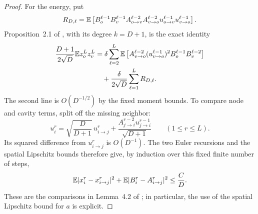 \begin{proof}
For the energy, put
\[
 R_{D,\ell}=\mathbb E\left[
 B_o^{\ell-1}B_v^{\ell-1}
 A_{o\to v}^{\ell-2}A_{v\to o}^{\ell-2}
 u_{o\to v}^{\ell-1}u_{v\to o}^{\ell-1}\right].
\]
Proposition~2.1 of \cite{EAMS2023}, with its degree $k=D+1$, is
the exact identity
\begin{equation}
 \begin{aligned}
 \frac{D+1}{2\sqrt D}\mathbb E z_o^Lz_v^L
 &=\delta\sum_{\ell=2}^L
   \mathbb E\left[A^{\ell-2}_{v\to o}(u^{\ell-1}_{v\to o})^2
                           B_o^{\ell-1}B_v^{\ell-2}\right]\\
 &\quad+\frac{\delta}{2\sqrt D}\sum_{\ell=1}^L R_{D,\ell}.
 \end{aligned}
 \label{eq:eams-exact-edge-expansion}
\end{equation}
The second line is $O(D^{-1/2})$ by the fixed moment bounds.
To compare node and cavity terms, split off the missing neighbor:
\[
 u_i^r=\sqrt{\frac D{D+1}}\,u_{i\to j}^r
       +\frac{A_{j\to i}^{r-2}u_{j\to i}^{r-1}}{\sqrt{D+1}}
 \qquad (1\le r\le L).
\]
Its squared difference from $u_{i\to j}^r$ is $O(D^{-1})$.
The two Euler recursions and the spatial Lipschitz bounds therefore
give, by induction over this fixed finite number of steps,
\begin{equation}
 \mathbb E|x_i^r-x_{i\to j}^r|^2+
 \mathbb E|B_i^r-A_{i\to j}^r|^2\le \frac C D.
 \label{eq:eams-node-cavity-bound}
\end{equation}
These are the comparisons in Lemma~4.2 of \cite{EAMS2023}; in
particular, the use of the spatial Lipschitz bound for $a$ is explicit.


\end{proof}

